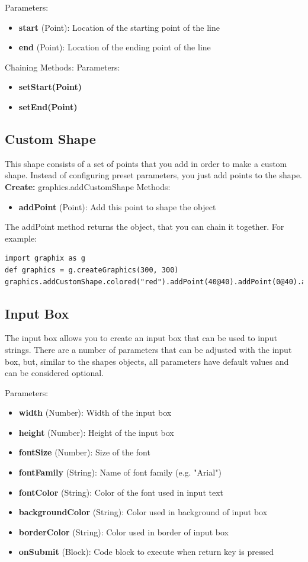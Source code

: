 \documentclass{article}
\begin{document}
Parameters:
\begin{itemize}
\item \textbf{start} (Point): Location of the starting point of the line
\item \textbf{end} (Point): Location of the ending point of the line
\end{itemize}

Chaining Methods:
Parameters:
\begin{itemize}
\item \textbf{setStart(Point)} 
\item \textbf{setEnd(Point)}
\end{itemize}

\subsection{Custom Shape}
This shape consists of a set of points that you add in order to make a custom shape.
Instead of configuring preset parameters, you just add points to the shape. 
\textbf{Create:} graphics.addCustomShape
Methods:
\begin{itemize}
\item \textbf{addPoint} (Point): Add this point to shape the object
\end{itemize}

The addPoint method returns the object, that you can chain it together. For example:
\begin{lstlisting}
import graphix as g
def graphics = g.createGraphics(300, 300)
graphics.addCustomShape.colored("red").addPoint(40@40).addPoint(0@40).addPoint(40@0).draw
\end{lstlisting}

\subsection{Input Box}
The input box allows you to create an input box that can be used to input strings. There are
a number of parameters that can be adjusted with the input box, but, similar to the shapes
objects, all parameters have default values and can be considered optional.

Parameters:
\begin{itemize}
\item \textbf{width} (Number): Width of the input box
\item \textbf{height} (Number): Height of the input box
\item \textbf{fontSize} (Number): Size of the font
\item \textbf{fontFamily} (String): Name of font family (e.g. "Arial")
\item \textbf{fontColor} (String): Color of the font used in input text
\item \textbf{backgroundColor} (String): Color used in background of input box
\item \textbf{borderColor} (String): Color used in border of input box
\item \textbf{onSubmit} (Block): Code block to execute when return key is pressed
\end{itemize}
\end{document}

